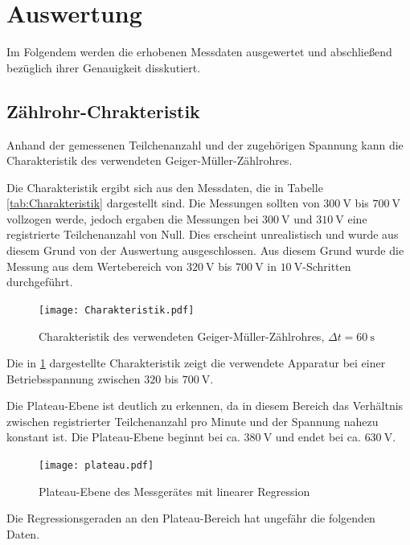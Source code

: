 \section{Auswertung}

Im Folgendem werden die erhobenen Messdaten ausgewertet und abschließend
bezüglich ihrer Genauigkeit disskutiert.

\subsection{Zählrohr-Chrakteristik}

Anhand der gemessenen Teilchenanzahl und der zugehörigen Spannung kann die
Charakteristik des verwendeten Geiger-Müller-Zählrohres.

Die Charakteristik ergibt sich aus den Messdaten, die in Tabelle \ref{tab:Charakteristik}
dargestellt sind. Die Messungen sollten von $\SI{300}{\volt}$ bis $\SI{700}{\volt}$
vollzogen werde, jedoch ergaben die Messungen bei $\SI{300}{\volt}$ und
$\SI{310}{\volt}$ eine registrierte Teilchenanzahl von Null.
Dies erscheint unrealistisch und wurde aus diesem Grund von der Auswertung
ausgeschlossen. Aus diesem Grund wurde die Messung aus dem Wertebereich
von $\SI{320}{\volt}$ bis $\SI{700}{\volt}$ in $\SI{10}{\volt}$-Schritten
durchgeführt.

\begin{figure}
  \centering
  \texttt{[image: Charakteristik.pdf]}
  \caption{Charakteristik des verwendeten Geiger-Müller-Zählrohres, $\Delta t = \SI{60}{\second}$}
  \label{fig:Charakteristik}
\end{figure}

Die in \ref{fig:Charakteristik} dargestellte Charakteristik zeigt die verwendete
Apparatur bei einer Betriebsspannung zwischen $\num{320}$ bis $\SI{700}{\volt}$.

Die Plateau-Ebene ist deutlich zu erkennen, da in diesem Bereich das Verhältnis zwischen
registrierter Teilchenanzahl pro Minute und der Spannung nahezu konstant ist.
Die Plateau-Ebene beginnt bei ca. $\SI{380}{\volt}$ und endet bei ca.
$\SI{630}{\volt}$.

\begin{figure}
  \centering
  \texttt{[image: plateau.pdf]}
  \caption{Plateau-Ebene des Messgerätes mit linearer Regression}
  \label{fig:Plateau}
\end{figure}

Die Regressionsgeraden an den Plateau-Bereich hat ungefähr die folgenden Daten.

